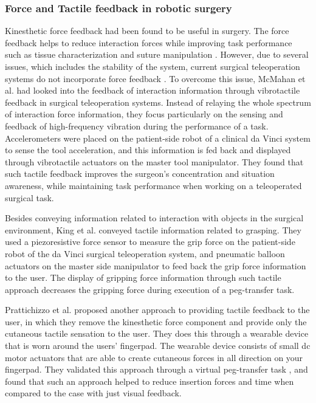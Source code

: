 \subsubsection{Force and Tactile feedback in robotic surgery}
Kinesthetic force feedback had been found to be useful in surgery. The force feedback helps to reduce interaction forces \cite{Wagner2007} while improving task performance such as tissue characterization \cite{Tholey2005} and suture manipulation \cite{Kitagawa2005}\cite{Talasaz2012}. However, due to several issues, which includes the stability of the system, current surgical teleoperation systems do not incorporate force feedback \cite{Okamura2009}. To overcome this issue, McMahan et al. \cite{McMahan2011} had looked into the feedback of interaction information through vibrotactile feedback in surgical teleoperation systems. Instead of relaying the whole spectrum of interaction force information, they focus particularly on the sensing and feedback of high-frequency vibration during the performance of a task. Accelerometers were placed on the patient-side robot of a clinical da Vinci system to sense the tool acceleration, and this information is fed back and displayed through vibrotactile actuators on the master tool manipulator. They found that such tactile feedback improves the surgeon's concentration and situation awareness, while maintaining task performance when working on a teleoperated surgical task.

Besides conveying information related to interaction with objects in the surgical environment, King et al. \cite{King2009} conveyed tactile information related to grasping. They used a piezoresistive force sensor to measure the grip force on the patient-side robot of the da Vinci surgical teleoperation system, and pneumatic balloon actuators on the master side manipulator to feed back the grip force information to the user. The display of gripping force information through such tactile approach decreases the gripping force during execution of a peg-transfer task.

Prattichizzo et al. \cite{Prattichizzo2012} proposed another approach to providing tactile feedback to the user, in which they remove the kinesthetic force component and provide only the cutaneous tactile sensation to the user. They does this through a wearable device that is worn around the users' fingerpad. The wearable device consists of small dc motor actuators that are able to create cutaneous forces in all direction on your fingerpad. They validated this approach through a virtual peg-transfer task \cite{Meli2014}, and found that such an approach helped to reduce insertion forces and time when compared to the case with just visual feedback.

